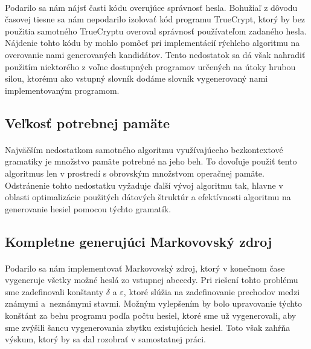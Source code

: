 \paragraph{}
Podarilo sa nám nájsť časti kódu overujúce správnosť hesla. Bohužiaľ z dôvodu časovej tiesne sa nám nepodarilo izolovať kód programu TrueCrypt, ktorý by bez použitia samotného TrueCryptu overoval správnosť používateľom zadaného hesla. Nájdenie tohto kódu by mohlo pomôcť pri implementácií rýchleho algoritmu na overovanie nami generovaných kandidátov. Tento nedostatok sa dá však nahradiť použitím niektorého z voľne dostupných programov určených na útoky hrubou silou, ktorému ako vstupný slovník dodáme slovník vygenerovaný nami implementovaným programom.

\subsection{Veľkosť potrebnej pamäte}
\paragraph{}
Najväčším nedostatkom samotného algoritmu využívajúceho bezkontextové gramatiky je množstvo pamäte potrebné na jeho beh. To dovoľuje použiť tento algoritmus len v prostredí s obrovským množstvom operačnej pamäte. Odstránenie tohto nedostatku vyžaduje ďalší vývoj algoritmu tak, hlavne v oblasti optimalizácie použitých dátových štruktúr a efektívnosti algoritmu na generovanie hesiel pomocou týchto gramatík.

\subsection{Kompletne generujúci Markovovský zdroj}
\paragraph{}
Podarilo sa nám implementovať Markovovský zdroj, ktorý v konečnom čase vygeneruje všetky možné heslá zo vstupnej abecedy. Pri riešení tohto problému sme zadefinovali konštanty \(\delta\) a \(\varepsilon\), ktoré slúžia na zadefinovanie prechodov medzi známymi a~neznámymi stavmi. Možným vylepšením by bolo upravovanie týchto konštánt za behu programu podľa počtu hesiel, ktoré sme už vygenerovali, aby sme zvýšili šancu vygenerovania zbytku existujúcich hesiel. Toto však zahŕňa výskum, ktorý by sa dal rozobrať v samostatnej práci.
